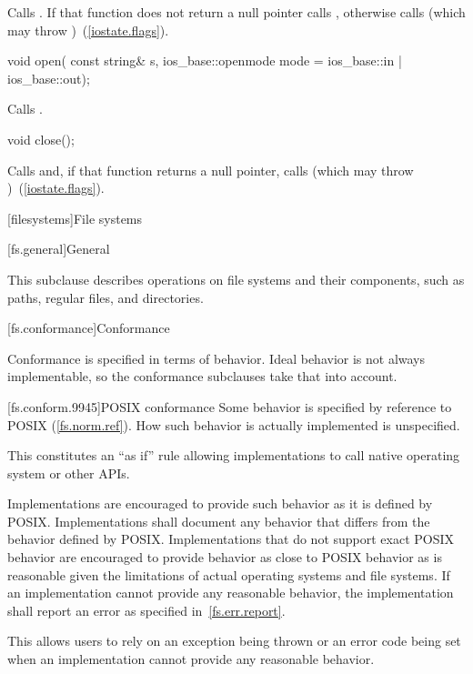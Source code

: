 \begin{itemdescr}
\pnum
\effects
Calls
.
If that function does not return a null pointer calls ,
otherwise calls
(which may throw
)~(\ref{iostate.flags}).
\end{itemdescr}

%
\begin{itemdecl}
void open(
  const string& s,
  ios_base::openmode mode = ios_base::in | ios_base::out);
\end{itemdecl}

\begin{itemdescr}
\pnum
\effects Calls .
\end{itemdescr}

%
\begin{itemdecl}
void close();
\end{itemdecl}

\begin{itemdescr}
\pnum
\effects
Calls
and, if that function
returns a null pointer,
calls
(which may throw
)~(\ref{iostate.flags}).
\end{itemdescr}

[filesystems]{File systems}

[fs.general]{General}

\pnum
This subclause describes operations on file systems and their components, such as paths,
regular files, and directories.

[fs.conformance]{Conformance}

\pnum
Conformance is specified in terms of behavior. Ideal behavior is not always
implementable, so the conformance subclauses take that into account.

[fs.conform.9945]{POSIX conformance}
\pnum
Some behavior is specified by reference to POSIX (\ref{fs.norm.ref}). How such behavior is actually implemented is unspecified.
\begin{note} This constitutes an ``as if'' rule allowing implementations
to call native
operating system or other APIs. \end{note}

\pnum
Implementations are encouraged to provide such behavior as it is defined by
POSIX. Implementations shall document any behavior that differs from the
behavior defined by POSIX. Implementations that do not support exact POSIX
behavior are encouraged to provide behavior as close to POSIX behavior as is reasonable given the
limitations of actual operating systems and file systems. If an implementation cannot provide any
reasonable behavior, the implementation shall report an error as specified in~\ref{fs.err.report}.
\begin{note} This allows users to rely on an exception being thrown or
an error code being set when an implementation cannot provide any reasonable
behavior.\end{note}

